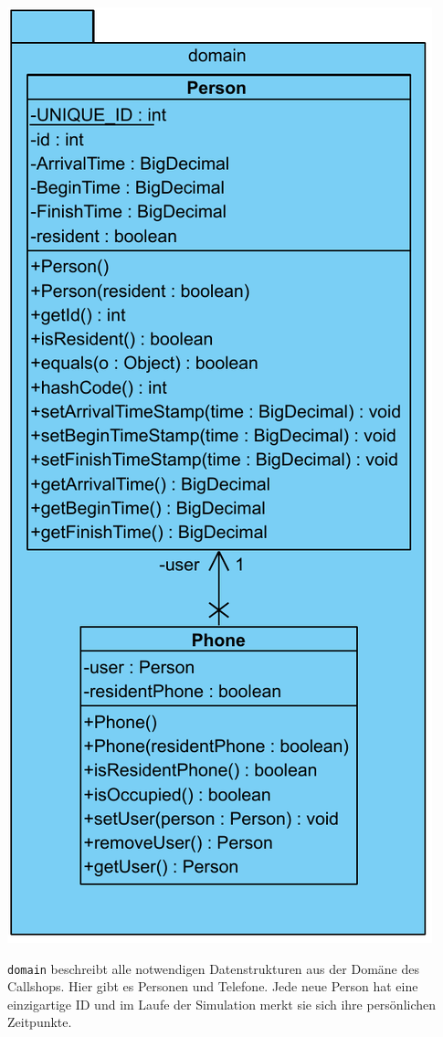 \includegraphics[scale=0.3]{abbildungen/uml/domain.pdf}


\texttt{domain} beschreibt alle notwendigen Datenstrukturen aus der Domäne des Callshops. Hier gibt es Personen und Telefone. Jede neue Person hat eine einzigartige ID und im Laufe der Simulation merkt sie sich ihre persönlichen Zeitpunkte.

